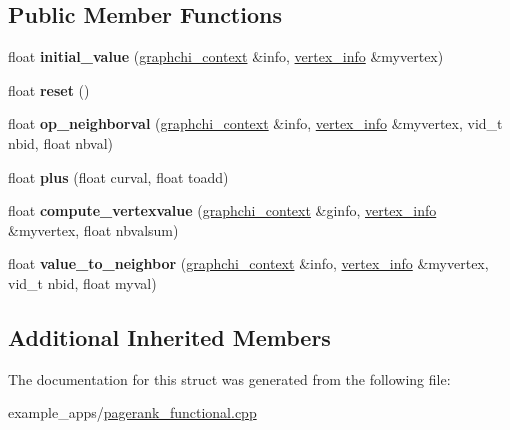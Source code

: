 \subsection*{Public Member Functions}
\begin{DoxyCompactItemize}
\item 
\hypertarget{structpagerank__kernel_a1c8a03bd758479e74e9116de1787f776}{float {\bfseries initial\-\_\-value} (\hyperlink{structgraphchi_1_1graphchi__context}{graphchi\-\_\-context} \&info, \hyperlink{structgraphchi_1_1vertex__info}{vertex\-\_\-info} \&myvertex)}\label{structpagerank__kernel_a1c8a03bd758479e74e9116de1787f776}

\item 
\hypertarget{structpagerank__kernel_ad9ac1fcbdcba06ca9a81a155333f365f}{float {\bfseries reset} ()}\label{structpagerank__kernel_ad9ac1fcbdcba06ca9a81a155333f365f}

\item 
\hypertarget{structpagerank__kernel_a83ed36d4260ea35549d4d60cd2ab94b1}{float {\bfseries op\-\_\-neighborval} (\hyperlink{structgraphchi_1_1graphchi__context}{graphchi\-\_\-context} \&info, \hyperlink{structgraphchi_1_1vertex__info}{vertex\-\_\-info} \&myvertex, vid\-\_\-t nbid, float nbval)}\label{structpagerank__kernel_a83ed36d4260ea35549d4d60cd2ab94b1}

\item 
\hypertarget{structpagerank__kernel_a664a391034ff4de9fc14fb737423a652}{float {\bfseries plus} (float curval, float toadd)}\label{structpagerank__kernel_a664a391034ff4de9fc14fb737423a652}

\item 
\hypertarget{structpagerank__kernel_a2d1625f82d432c3c177ee3536f5d076f}{float {\bfseries compute\-\_\-vertexvalue} (\hyperlink{structgraphchi_1_1graphchi__context}{graphchi\-\_\-context} \&ginfo, \hyperlink{structgraphchi_1_1vertex__info}{vertex\-\_\-info} \&myvertex, float nbvalsum)}\label{structpagerank__kernel_a2d1625f82d432c3c177ee3536f5d076f}

\item 
\hypertarget{structpagerank__kernel_ad2f774d1c47139d77ce9a0bcef70d3de}{float {\bfseries value\-\_\-to\-\_\-neighbor} (\hyperlink{structgraphchi_1_1graphchi__context}{graphchi\-\_\-context} \&info, \hyperlink{structgraphchi_1_1vertex__info}{vertex\-\_\-info} \&myvertex, vid\-\_\-t nbid, float myval)}\label{structpagerank__kernel_ad2f774d1c47139d77ce9a0bcef70d3de}

\end{DoxyCompactItemize}
\subsection*{Additional Inherited Members}


The documentation for this struct was generated from the following file\-:\begin{DoxyCompactItemize}
\item 
example\-\_\-apps/\hyperlink{pagerank__functional_8cpp}{pagerank\-\_\-functional.\-cpp}\end{DoxyCompactItemize}
